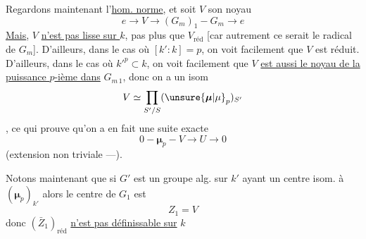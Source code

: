 Regardons maintenant l'\uline{hom. norme}, et soit $V$ son noyau
\[
e\longrightarrow V\longrightarrow(G_m)_1\mathbin{-}G_m\longrightarrow e
\]
\uline{Mais}, $V$ \uline{n'est pas lisse sur $k$},  \deleted{Mais [dans le cas où \unsure{donc}} pas plus que $V_{\mathrm{réd}}$ [car autrement ce serait le radical  de $G_m$].
D'ailleurs, dans le cas où $[k':k]=p$, on voit facilement que $V$ est réduit. D'ailleurs, dans le cas où $k'^p\subset k$, on voit facilement que $V$ \uline{est aussi le noyau de la puissance $p$-ième dans} $G_{m\,1}$, donc on a un isom
\[
V\simeq\prod_{S'/S}(\unsure{\boldsymbol{\mu}|\mu}_p)_{S'}
\]
, ce qui prouve qu'on a en fait une suite exacte
\[
0\mathbin{-}\boldsymbol{\mu}_p\mathbin{-}V\longrightarrow U\longrightarrow0
\]
(extension non triviale ---).

Notons maintenant que si $G'$ est un groupe alg.  sur $k'$  ayant un centre isom. à $(\boldsymbol{\mu}_p)_{k'}$
alors le centre de $G_1$ est
\[
Z_1=V
\]
donc $(\bar Z_1)_{\mathrm{réd}}$ \uline{n'est pas définissable sur} $k$
